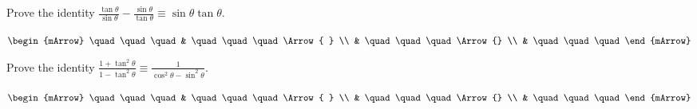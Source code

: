 

\begin{mtask}[resume]
    \task \begin{exercise} Prove the identity $ \frac{\tan \theta}{\sin \theta} - \frac{\sin \theta}{\tan \theta} \equiv \sin \theta \tan \theta$.
            \begin{envSolution}
                $\begin{mArrow}
                      \quad\quad\quad 
                    & \quad\quad\quad      \Arrow{ } \\
                    & \quad\quad\quad      \Arrow{} \\
                    & \quad\quad\quad                                          
                \end{mArrow}$
                \begin{shortsolution}
                    \quad\quad\quad
                \end{shortsolution}
            \end{envSolution}
          \end{exercise}
\end{mtask}


\begin{mtask}[resume]
    \task \begin{exercise} Prove the identity $ \frac{1+ \tan^2 \theta}{1 - \tan^2 \theta} \equiv \frac{1}{\cos^2 \theta - \sin^2 \theta}$.
            \begin{envSolution}
                $\begin{mArrow}
                      \quad\quad\quad 
                    & \quad\quad\quad      \Arrow{ } \\
                    & \quad\quad\quad      \Arrow{} \\
                    & \quad\quad\quad                                          
                \end{mArrow}$
                \begin{shortsolution}
                    \quad\quad\quad
                \end{shortsolution}
            \end{envSolution}
          \end{exercise}
\end{mtask}


